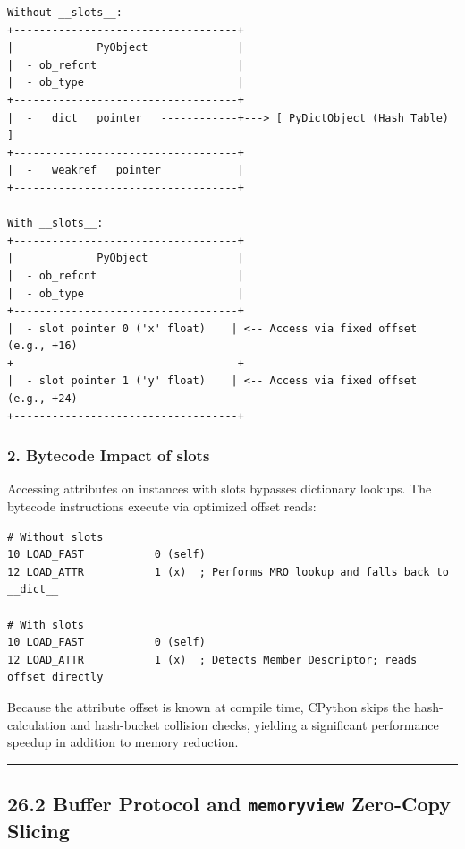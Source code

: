 \begin{lstlisting}
Without __slots__:
+-----------------------------------+
|             PyObject              |
|  - ob_refcnt                      |
|  - ob_type                        |
+-----------------------------------+
|  - __dict__ pointer   ------------+---> [ PyDictObject (Hash Table) ]
+-----------------------------------+
|  - __weakref__ pointer            |
+-----------------------------------+

With __slots__:
+-----------------------------------+
|             PyObject              |
|  - ob_refcnt                      |
|  - ob_type                        |
+-----------------------------------+
|  - slot pointer 0 ('x' float)    | <-- Access via fixed offset (e.g., +16)
+-----------------------------------+
|  - slot pointer 1 ('y' float)    | <-- Access via fixed offset (e.g., +24)
+-----------------------------------+
\end{lstlisting}

\hypertarget{bytecode-impact-of-slots}{%
\subsubsection{2. Bytecode Impact of
slots}\label{bytecode-impact-of-slots}}

Accessing attributes on instances with slots bypasses dictionary
lookups. The bytecode instructions execute via optimized offset reads:

\begin{lstlisting}
# Without slots
10 LOAD_FAST           0 (self)
12 LOAD_ATTR           1 (x)  ; Performs MRO lookup and falls back to __dict__

# With slots
10 LOAD_FAST           0 (self)
12 LOAD_ATTR           1 (x)  ; Detects Member Descriptor; reads offset directly
\end{lstlisting}

Because the attribute offset is known at compile time, CPython skips the
hash-calculation and hash-bucket collision checks, yielding a
significant performance speedup in addition to memory reduction.

\begin{center}\rule{0.5\linewidth}{0.5pt}\end{center}

\hypertarget{buffer-protocol-and-memoryview-zero-copy-slicing}{%
\subsection{\texorpdfstring{26.2 Buffer Protocol and \texttt{memoryview}
Zero-Copy
Slicing}{26.2 Buffer Protocol and memoryview Zero-Copy Slicing}}\label{buffer-protocol-and-memoryview-zero-copy-slicing}}


